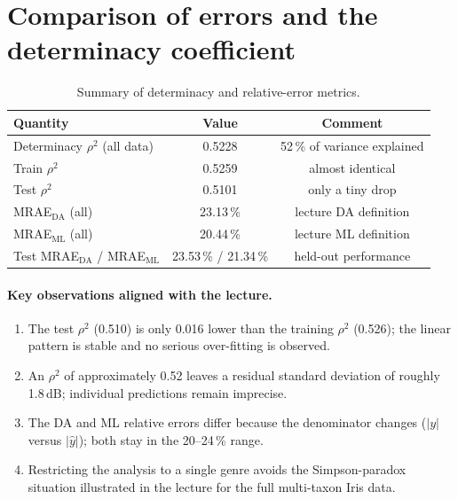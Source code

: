 \documentclass[11pt,a4paper]{article}
\begin{document}
\section{Comparison of errors and the determinacy coefficient}

\begin{table}[H]
\centering
\caption{Summary of determinacy and relative-error metrics.}
\label{tab:compare}
\begin{tabular}{lcc}
\toprule
Quantity & Value & Comment \\
\midrule
Determinacy $\rho^2$ (all data) & 0.5228 & 52\,\% of variance explained \\
Train $\rho^2$                 & 0.5259 & almost identical \\
Test $\rho^2$                  & 0.5101 & only a tiny drop \\
MRAE$_{\mathrm{DA}}$ (all)     & 23.13\,\% & lecture DA definition \\
MRAE$_{\mathrm{ML}}$ (all)     & 20.44\,\% & lecture ML definition \\
Test MRAE$_{\mathrm{DA}}$ / MRAE$_{\mathrm{ML}}$ & 23.53\,\% / 21.34\,\% & held-out performance \\
\bottomrule
\end{tabular}
\end{table}

\paragraph{Key observations aligned with the lecture.}
\begin{enumerate}
  \item The test $\rho^2$ (0.510) is only 0.016 lower than the training
        $\rho^2$ (0.526); the linear pattern is stable and no serious
        over-fitting is observed.
  \item An $\rho^2$ of approximately 0.52 leaves a residual standard deviation
        of roughly 1.8\,dB; individual predictions remain imprecise.
  \item The DA and ML relative errors differ because the denominator changes
        ($|y|$ versus $|\hat{y}|$); both stay in the 20--24\,\% range.
  \item Restricting the analysis to a single genre avoids the
        Simpson-paradox situation illustrated in the lecture for the full
        multi-taxon Iris data.
\end{enumerate}
\end{document}
